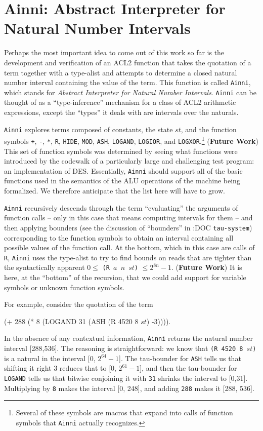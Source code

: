 \documentclass[submission,copyright,creativecommons]{eptcs}
\newcommand{\ptt}[1]{\tt{#1}}
\begin{document}
\section{Ainni:  Abstract Interpreter for Natural Number Intervals}
\label{ainni}

Perhaps the most important idea to come out of this work
so far is the development and verification of an ACL2 function that takes the
quotation of a term together with a type-alist and attempts to determine a
closed natural number interval containing the value of the term.  This
function is called {\ptt{Ainni}}, which stands for {\em{Abstract Interpreter
    for Natural Number Intervals}}.  {\ptt{Ainni}} can be thought of as a
``type-inference'' mechanism for a class of ACL2 arithmetic expressions,
except the ``types'' it deals with are intervals over the naturals.

{\ptt{Ainni}} explores terms composed of constants, the state $st$, and the
function symbols {\ptt{+}}, {\ptt{-}}, {\ptt{*}}, {\ptt{R}}, {\ptt{HIDE}},
{\ptt{MOD}}, {\ptt{ASH}}, {\ptt{LOGAND}}, {\ptt{LOGIOR}}, and
{\ptt{LOGXOR}}.\footnote{Several of these symbols are macros that expand into
  calls of function symbols that {\ptt{Ainni}} actually recognizes.}  ({\bf{Future Work}})
This set of function symbols was determined by seeing what functions were
introduced by the codewalk of a particularly large and challenging test
program: an implementation of DES.  Essentially, {\ptt{Ainni}} should support
all of the basic functions used in the semantics of the ALU operations of the
machine being formalized.  We therefore anticipate that the list here will
have to grow.

{\ptt{Ainni}} recursively descends through the term ``evaluating'' the
arguments of function calls -- only in this case that means computing
intervals for them -- and then applying bounders (see the discussion of ``bounders'' in :DOC
{\ptt{tau-system}}) corresponding to the function symbols to obtain an
interval containing all possible values of the function call.  At the bottom,
which in this case are calls of {\ptt{R}}, {\ptt{Ainni}} uses the type-alist
to try to find bounds on reads that are tighter than the syntactically
apparent $0 \leq$ {\ptt{(R $a$ $n$ $st$)}} $\leq 2^{8n}-1$.  ({\bf{Future
    Work}}) It is here, at the ``bottom'' of the recursion, that we could add
support for variable symbols or unknown function symbols.

For example, consider the quotation of the term
\begin{acl2p}
(+ 288 (* 8 (LOGAND 31 (ASH (R 4520 8 $st$) -3)))).
\end{acl2p}
In the absence of any contextual information, {\ptt{Ainni}} returns the
natural number interval [288,536].  The reasoning is straightforward: we know
that {\ptt{(R 4520 8 $st$)}} is a natural in the interval [0, $2^{64}-1$].
The tau-bounder for {\ptt{ASH}} tells us that shifting it right 3 reduces
that to [0, $2^{61}-1$], and then the tau-bounder for {\ptt{LOGAND}} tells us
that bitwise conjoining it with {\ptt{31}} shrinks the interval to [0,31].
Multiplying by {\ptt{8}} makes the interval [0, 248], and adding {\ptt{288}}
makes it [288, 536].
\end{document}
